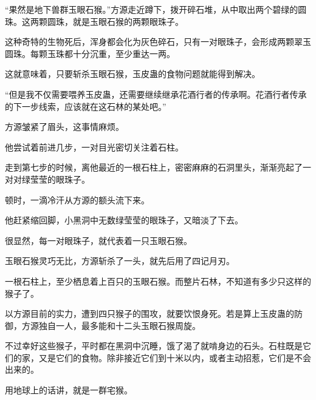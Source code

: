 \begin{this_body}
“果然是地下兽群玉眼石猴。”方源走近蹲下，拨开碎石堆，从中取出两个碧绿的圆珠。这两颗圆珠，就是玉眼石猴的两颗眼珠子。

这种奇特的生物死后，浑身都会化为灰色碎石，只有一对眼珠子，会形成两颗翠玉圆珠。每颗玉珠都十分沉重，至少重达一两。

这就意味着，只要斩杀玉眼石猴，玉皮蛊的食物问题就能得到解决。

“但是我不仅需要喂养玉皮蛊，还需要继续继承花酒行者的传承啊。花酒行者传承的下一步线索，应该就在这石林的某处吧。”

方源皱紧了眉头，这事情麻烦。

他尝试着前进几步，一对目光密切关注着石柱。

走到第七步的时候，离他最近的一根石柱上，密密麻麻的石洞里头，渐渐亮起了一对对绿莹莹的眼珠子。

顿时，一滴冷汗从方源的额头流下来。

他赶紧缩回脚，小黑洞中无数绿莹莹的眼珠子，又暗淡了下去。

很显然，每一对眼珠子，就代表着一只玉眼石猴。

玉眼石猴灵巧无比，方源斩杀了一头，就先后用了四记月刃。

一根石柱上，至少栖息着上百只的玉眼石猴。而整片石林，不知道有多少只这样的猴子了。

以方源目前的实力，遭到四只猴子的围攻，就要饮恨身死。若是算上玉皮蛊的防御，方源独自一人，最多能和十二头玉眼石猴周旋。

不过幸好这些猴子，平时都在黑洞中沉睡，饿了渴了就啃身边的石头。石柱既是它们的家，又是它们的食物。除非接近它们到十米以内，或者主动招惹，它们是不会出来的。

用地球上的话讲，就是一群宅猴。

\end{this_body}

